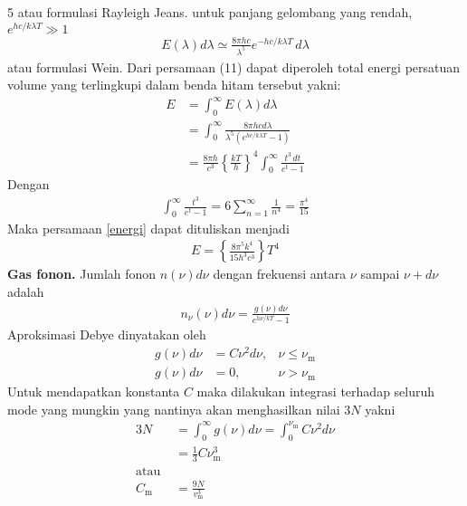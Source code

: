 \documentclass[a4paper  , 6 pt]{article}
\begin{document}
\begin{tiny}
\begin{multicols} {5}
atau formulasi Rayleigh Jeans. 
untuk panjang gelombang yang rendah, $e^{hc/k \lambda T} \gg 1$ 
\begin{align}
E(\lambda ) d\lambda  \simeq \frac{8 \pi h c}{\lambda^5} e^{- hc/k \lambda T} \, d \lambda 
\end{align}
atau formulasi Wein.
 Dari persamaan (11) dapat diperoleh total energi persatuan volume yang terlingkupi dalam benda hitam tersebut yakni:
 \begin{align}
 E& = \int_{0}^{\infty} E(\lambda) d \lambda \nonumber \\
 & = \int_{0}^{\infty} \frac{8 \pi h c d \lambda}{\lambda^5 (e^{hc /k \lambda T} -1)} \nonumber \\
 & = \frac{8 \pi h}{c^3} \left \lbrace \frac{kT}{h} \right \rbrace^4 \int_{0}^{\infty} \frac{t^3 \, dt }{e^t - 1}  \label{energi}
 \end{align}
 Dengan 
 \begin{align}
 \int_{0}^{\infty} \frac{t^3}{e^t -1} = 6 \sum_{n = 1}^\infty \frac{1}{n^4} = \frac{\pi^4}{15} 
 \end{align}
 Maka persamaan \ref{energi} dapat dituliskan menjadi 
 \begin{align}
\boxed{E = \left \lbrace  \frac{8 \pi^5 k^4 }{15 h^3 c^3 }\right \rbrace  T^4}
 \end{align}
 \newline
\textbf{Gas fonon.} \newline
Jumlah fonon $n(\nu) d\nu$ dengan frekuensi antara $\nu$ sampai $\nu + d \nu$ adalah
\begin{align}
n_\nu(\nu) d\nu = \frac{g(\nu) d\nu}{e^{h\nu /kT} - 1} \tag{13}
\end{align}
Aproksimasi Debye dinyatakan oleh
\begin{align}
g(\nu) d\nu &  = C \nu^2 d \nu , & \nu \le \nu_\mathrm{m} \nonumber \\
g(\nu) d\nu & = 0, & \nu > \nu_\mathrm{m} \nonumber 
\end{align}
Untuk mendapatkan konstanta $C$ maka dilakukan  integrasi terhadap seluruh mode yang mungkin yang nantinya akan menghasilkan nilai $3N$ yakni
\begin{align}
3N & = \int_{0}^{\infty} g(\nu)  d\nu  = \int_{0}^{\nu_\mathrm{m}} C \nu^2  d\nu  \nonumber \\
& = \frac{1}{3} C \nu_\mathrm{m}^3 \nonumber \\
\text{atau }& \nonumber \\
C_\mathrm{m}& = \frac{9N}{v_\mathrm{m}^3} \nonumber
 \end{align}

\end{multicols}
\end{tiny}
\end{document}
